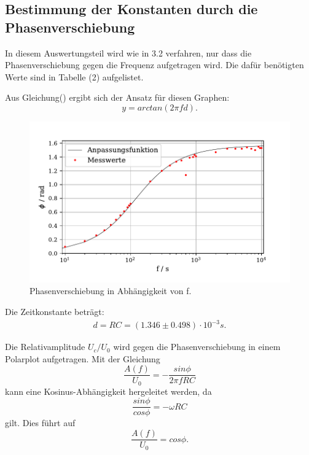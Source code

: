 \subsection{Bestimmung der Konstanten durch die Phasenverschiebung}
In diesem Auswertungsteil wird wie in 3.2 verfahren, nur dass die Phasenverschiebung gegen die Frequenz aufgetragen wird.
Die dafür benötigten Werte sind in Tabelle (2) aufgelistet.

\noindent Aus Gleichung() ergibt sich der Ansatz für diesen Graphen:
\begin{equation}
    y = arctan(2 \pi f  d) .
\end{equation}
\begin{figure}[H]
  \centering
  \includegraphics{plot3.pdf}
  \caption{Phasenverschiebung in Abhängigkeit von f.}
  \label{fig:plot}
\end{figure}
\noindent Die Zeitkonstante beträgt:
\begin{align*}
   d = RC = (1.346 \pm 0.498) \cdot 10^{-3} s .
\end{align*}



\noindent Die Relativamplitude $U_c/U_0$ wird gegen die Phasenverschiebung in einem Polarplot aufgetragen.
Mit der Gleichung
\begin{equation*}
    \frac{A(f)}{U_0} = -\frac{sin \phi}{2\pi f RC} 
\end{equation*}
kann eine Kosinus-Abhängigkeit hergeleitet werden, da
\begin{equation*}
    \frac{sin\phi}{cos\phi} = -\omega RC 
\end{equation*}
gilt. Dies führt auf
\begin{equation}
    \frac{A(f)}{U_0} = cos\phi .
\end{equation}

